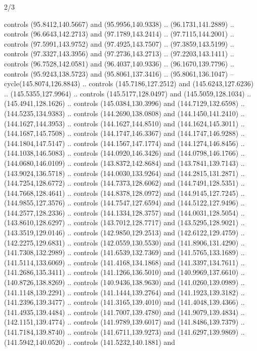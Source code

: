 \begin{flagdescription}{2/3}
\begin{scope}[shift={(0.5\flaglength,0.5)},scale=\flagwidth/320]
\begin{scope}[y=0.8pt, x=0.8pt, yscale=-1,shift={(-118.3,-146)}]
  controls (95.8412,140.5667) and (95.9956,140.9338) .. (96.1731,141.2889) ..
  controls (96.6643,142.2713) and (97.1789,143.2414) .. (97.7115,144.2001) ..
  controls (97.5991,143.9752) and (97.4925,143.7507) .. (97.3859,143.5199) ..
  controls (97.3327,143.3956) and (97.2736,143.2713) .. (97.2203,143.1411) ..
  controls (96.7528,142.0581) and (96.4037,140.9336) .. (96.1670,139.7796) ..
  controls (95.9243,138.5723) and (95.8061,137.3416) .. (95.8061,136.1047) --
  cycle(145.8074,126.8843) .. controls (145.7186,127.2512) and
  (145.6243,127.6236) .. (145.5355,127.9964) .. controls (145.5177,128.0497) and
  (145.5059,128.1034) .. (145.4941,128.1626) .. controls (145.0384,130.3996) and
  (144.7129,132.6598) .. (144.5235,134.9383) .. controls (144.2690,138.0808) and
  (144.1450,141.2410) .. (144.1627,144.3953) .. controls (144.1627,144.8510) and
  (144.1624,145.3011) .. (144.1687,145.7508) .. controls (144.1747,146.3367) and
  (144.1747,146.9288) .. (144.1804,147.5147) .. controls (144.1567,147.1774) and
  (144.1274,146.8456) .. (144.1038,146.5083) .. controls (144.0920,146.3426) and
  (144.0798,146.1766) .. (144.0680,146.0109) .. controls (143.8372,142.8684) and
  (143.7841,139.7143) .. (143.9024,136.5718) .. controls (144.0030,133.9264) and
  (144.2815,131.2871) .. (144.7254,128.6772) .. controls (144.7373,128.6062) and
  (144.7491,128.5351) .. (144.7668,128.4641) .. controls (144.8378,128.0972) and
  (144.9145,127.7245) .. (144.9855,127.3576) .. controls (144.7547,127.6594) and
  (144.5122,127.9496) .. (144.2577,128.2336) .. controls (144.1334,128.3757) and
  (144.0031,128.5054) .. (143.8610,128.6297) .. controls (143.7012,128.7717) and
  (143.5295,128.9021) .. (143.3519,129.0146) .. controls (142.9850,129.2513) and
  (142.6122,129.4759) .. (142.2275,129.6831) .. controls (142.0559,130.5530) and
  (141.8906,131.4290) .. (141.7308,132.2989) .. controls (141.6539,132.7369) and
  (141.5765,133.1689) .. (141.5114,133.6069) .. controls (141.4168,134.1868) and
  (141.3397,134.7611) .. (141.2686,135.3411) .. controls (141.1266,136.5010) and
  (140.9969,137.6610) .. (140.8726,138.8269) .. controls (140.9436,138.9630) and
  (141.0260,139.0989) .. (141.1148,139.2291) .. controls (141.1444,139.2764) and
  (141.1923,139.3182) .. (141.2396,139.3477) .. controls (141.3165,139.4010) and
  (141.4048,139.4366) .. (141.4935,139.4484) .. controls (141.7007,139.4780) and
  (141.9079,139.4834) .. (142.1151,139.4774) .. controls (141.9789,139.6017) and
  (141.8486,139.7379) .. (141.7184,139.8740) .. controls (141.6711,139.9273) and
  (141.6297,139.9869) .. (141.5942,140.0520) .. controls (141.5232,140.1881) and

\end{scope}
\end{scope}
\end{flagdescription}
